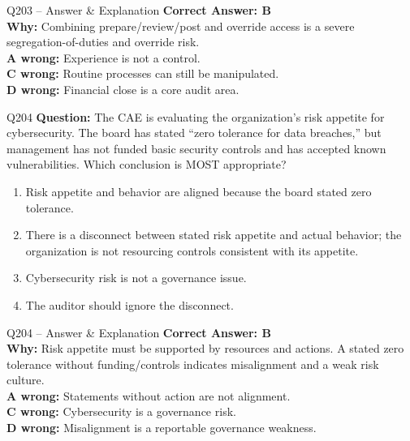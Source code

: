 \documentclass[aspectratio=169,10pt]{beamer}
\begin{document}
	\begin{frame}[t]{Q203 -- Answer \& Explanation}
		\small
		\textbf{Correct Answer: B} \\[4pt]
		\textbf{Why:} Combining prepare/review/post and override access is a severe segregation-of-duties and override risk. \\[4pt]
		\textbf{A wrong:} Experience is not a control. \\[2pt]
		\textbf{C wrong:} Routine processes can still be manipulated. \\[2pt]
		\textbf{D wrong:} Financial close is a core audit area.
	\end{frame}
	
	\begin{frame}[t]{Q204}
		\small
		\textbf{Question:} The CAE is evaluating the organization's risk appetite for cybersecurity. The board has stated ``zero tolerance for data breaches,'' but management has not funded basic security controls and has accepted known vulnerabilities. Which conclusion is MOST appropriate?
		\begin{enumerate}[label=\Alph*.,itemsep=1pt,topsep=2pt]
			\item Risk appetite and behavior are aligned because the board stated zero tolerance.
			\item There is a disconnect between stated risk appetite and actual behavior; the organization is not resourcing controls consistent with its appetite.
			\item Cybersecurity risk is not a governance issue.
			\item The auditor should ignore the disconnect.
		\end{enumerate}
	\end{frame}
	
	\begin{frame}[t]{Q204 -- Answer \& Explanation}
		\small
		\textbf{Correct Answer: B} \\[4pt]
		\textbf{Why:} Risk appetite must be supported by resources and actions. A stated zero tolerance without funding/controls indicates misalignment and a weak risk culture. \\[4pt]
		\textbf{A wrong:} Statements without action are not alignment. \\[2pt]
		\textbf{C wrong:} Cybersecurity is a governance risk. \\[2pt]
		\textbf{D wrong:} Misalignment is a reportable governance weakness.
	\end{frame}
	
\end{document}
